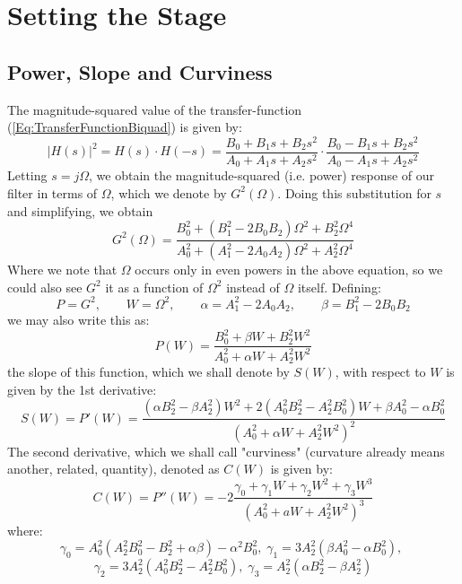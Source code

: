 \section{Setting the Stage}

\subsection{Power, Slope and Curviness}
The magnitude-squared value of the transfer-function (\ref{Eq:TransferFunctionBiquad}) is given by:
\begin{equation}
 |H(s)|^2 = H(s) \cdot H(-s) 
 = \frac{B_0 + B_1 s + B_2 s^2}{A_0 + A_1 s + A_2 s^2} \cdot \frac{B_0 - B_1 s + B_2 s^2}{A_0 - A_1 s + A_2 s^2}
\end{equation}
Letting $s = j \Omega$, we obtain the magnitude-squared (i.e. power) response of our filter in terms of $\Omega$, which we denote by $G^2(\Omega)$. Doing this substitution for $s$ and simplifying, we obtain
\begin{equation}
\label{Eq:MagnitudeSquaredBiquad}
 G^2(\Omega) = \frac{B_0^2 + (B_1^2 - 2 B_0 B_2) \Omega^2 + B_2^2 \Omega^4}{A_0^2 + (A_1^2 - 2 A_0 A_2) \Omega^2 + A_2^2 \Omega^4}
\end{equation}
Where we note that $\Omega$ occurs only in even powers in the above equation, so we could also see $G^2$ it as a function of $\Omega^2$ instead of $\Omega$ itself. Defining:
\begin{equation}
\label{Eq:AlphaBeta}
 P = G^2,  \qquad
 W = \Omega^2, \qquad
 \alpha = A_1^2 - 2 A_0 A_2, \qquad
 \beta = B_1^2 - 2 B_0 B_2
\end{equation}
we may also write this as:
\begin{equation}
\label{Eq:MagnitudeSquaredSimplified}
 P(W) = \frac{B_0^2 + \beta W + B_2^2 W^2}{A_0^2 + \alpha W + A_2^2 W^2}
\end{equation}
the slope of this function, which we shall denote by $S(W)$, with respect to $W$ is given by the 1st derivative:
\begin{equation}
\label{Eq:MagnitudeSlope}
 S(W) = P'(W) = \frac{(\alpha B_2^2-\beta A_2^2)W^2 + 2(A_0^2 B_2^2-A_2^2 B_0^2)W + \beta A_0^2 - \alpha B_0^2}  
                     {(A_0^2 + \alpha W + A_2^2 W^2)^2}
\end{equation}
The second derivative, which we shall call "curviness" (curvature already means another, related, quantity), denoted as $C(W)$ is given by:
\begin{equation}
\label{Eq:MagnitudeCurvature}
 C(W) = P''(W) = 
 -2\frac{\gamma_0 + \gamma_1 W + \gamma_2 W^2 + \gamma_3 W^3}{(A_0^2 + a W + A_2^2 W^2)^3}
\end{equation}
where:
\begin{equation}
 \gamma_0 = A_0^2 (A_2^2 B_0^2 - B_2^2 + \alpha \beta) - \alpha^2 B_0^2, \;
 \gamma_1 = 3 A_2^2 (\beta A_0^2 - \alpha B_0^2), \;
\end{equation}
\begin{equation}
 \gamma_2 = 3 A_2^2 (A_0^2 B_2^2 - A_2^2 B_0^2), \;
 \gamma_3 = A_2^2 (\alpha B_2^2 - \beta A_2^2)
\end{equation}

